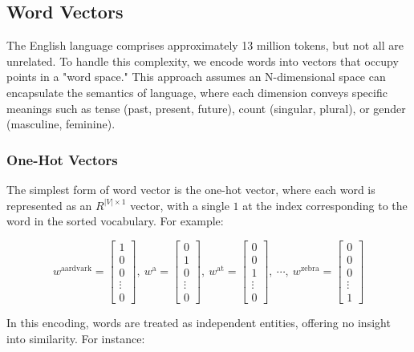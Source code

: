 \subsection{Word Vectors}
The English language comprises approximately 13 million tokens, but not all are unrelated. To handle this complexity, we encode words into vectors that occupy points in a "word space." This approach assumes an N-dimensional space can encapsulate the semantics of language, where each dimension conveys specific meanings such as tense (past, present, future), count (singular, plural), or gender (masculine, feminine).

\subsubsection{One-Hot Vectors}
The simplest form of word vector is the one-hot vector, where each word is represented as an $R^{\left| V \right| \times 1}$ vector, with a single $1$ at the index corresponding to the word in the sorted vocabulary. For example:

\begin{equation*}
w^{\text{aardvark}} = 
\begin{bmatrix}
1 \\
0 \\
0 \\
\vdots \\
0
\end{bmatrix}
,\ 
w^{\text{a}} = 
\begin{bmatrix}
0 \\
1 \\
0 \\
\vdots \\
0
\end{bmatrix}
,\ 
w^{\text{at}} = 
\begin{bmatrix}
0 \\
0 \\
1 \\
\vdots \\
0
\end{bmatrix}
,\ 
\cdots
,\ 
w^{\text{zebra}} = 
\begin{bmatrix}
0 \\
0 \\
0 \\
\vdots \\
1
\end{bmatrix}
\end{equation*}

In this encoding, words are treated as independent entities, offering no insight into similarity. For instance: 

